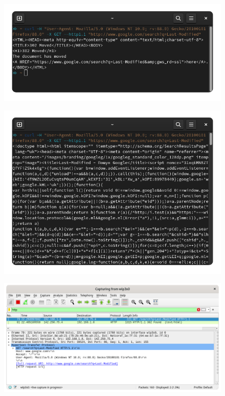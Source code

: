\documentclass{article}
\begin{document}
\begin{normalsize}
\begin{figure}[H]
	\centering
	\includegraphics[width=\textwidth]{31}
\end{figure}
\begin{figure}[H]
	\centering
	\includegraphics[width=\textwidth]{32}
\end{figure}
\begin{figure}[H]
	\centering
	\includegraphics[width=\textwidth]{33}

\end{figure}
\end{normalsize}
\end{document}
